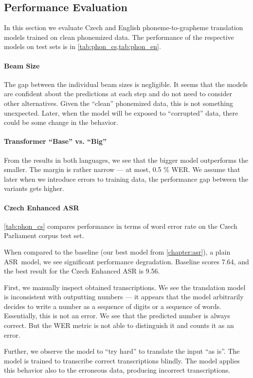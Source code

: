 \subsection{Performance Evaluation}
In this section we evaluate Czech and English phoneme-to-grapheme translation models trained on clean phonemized data. The performance of the respective models on test sets is in \cref{tab:phon_cs,tab:phon_en}.

\paragraph{Beam Size} The gap between the individual beam sizes is negligible. It seems that the models are confident about the predictions at each step and do not need to consider other alternatives. Given the ``clean'' phonemized data, this is not something unexpected. Later, when the model will be exposed to ``corrupted'' data, there could be some change in the behavior.

\paragraph{Transformer ``Base'' vs. ``Big''} From the results in both languages, we see that the bigger model outperforms the smaller. The margin is rather narrow --- at most, 0.5 \% WER. We assume that later when we introduce errors to training data, the performance gap between the variants gets higher.

\paragraph{Czech Enhanced ASR}
\cref{tab:phon_cs} compares performance in terms of word error rate on the Czech Parliament corpus test set. 

When compared to the baseline (our best model from \cref{chapter:asr}), a plain ASR~model, we see significant performance degradation. Baseline scores 7.64, and the best result for the Czech Enhanced ASR is 9.56. 

First, we manually inspect obtained transcriptions. We see the translation model is inconsistent with outputting numbers --- it appears that the model arbitrarily decides to write a number as a  sequence of digits or a sequence of words. Essentially, this is not an error. We see that the predicted number is always correct. But the WER metric is not able to distinguish it and counts it as an error.

Further, we observe the model to ``try hard'' to translate the input ``as is''. The model is trained to transcribe correct transcriptions blindly. The model applies this behavior also to the erroneous data, producing incorrect transcriptions.    

